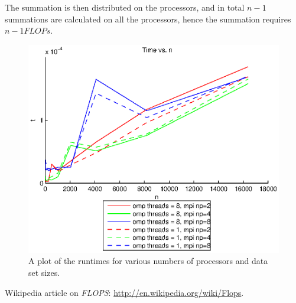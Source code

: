 The summation is then distributed on the processors, and in total $n-1$ summations are calculated on all the processors, hence the summation requires $n-1 FLOPs$.

\begin{figure}[htbp]
  \centering
  \includegraphics[]{graphics/runtime.eps}
  \caption{A plot of the runtimes for various numbers of processors and data set sizes.}
  \label{fig:runtime}
\end{figure}

\begin{thebibliography}{1}
   Wikipedia article on \emph{FLOPS}: \url{http://en.wikipedia.org/wiki/Flops}.
\end{thebibliography}


